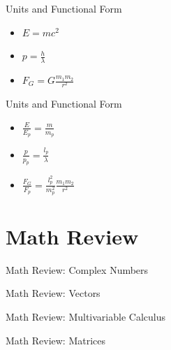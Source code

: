 \documentclass[10pt,xcolor={table,dvipsnames},t]{beamer}
\begin{document}
\begin{frame}{Units and Functional Form}
    \begin{itemize}
        \item $E = mc^2$
        \item $p = \frac{h}{\lambda}$
        \item $F_G = G \frac{m_1 m_2}{r^2}$
    \end{itemize}
\end{frame}

\begin{frame}{Units and Functional Form}
    \begin{itemize}
        \item $\frac{E}{E_p} = \frac{m}{m_p}$
        \item $\frac{p}{p_p} = \frac{l_p}{\lambda}$
        \item $\frac{F_G}{F_p} = \frac{l_p^2}{m_p^2}\frac{m_1 m_2}{r^2}$
    \end{itemize}
\end{frame}

\section{Math Review}

\begin{frame}{Math Review: Complex Numbers}
\end{frame}

\begin{frame}{Math Review: Vectors}
\end{frame}

\begin{frame}{Math Review: Multivariable Calculus}
\end{frame}

\begin{frame}{Math Review: Matrices}
\end{frame}
\end{document}
